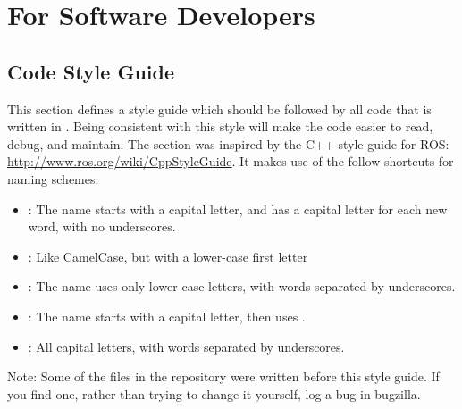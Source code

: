 
\chapter{For Software Developers}

\section{Code Style Guide}

This section defines a style guide which should be followed by all code that is written in \drake.  Being consistent with this style will make the code easier to read, debug, and maintain.  The section was inspired by the C++ style guide for ROS: \url{http://www.ros.org/wiki/CppStyleGuide}.  It makes use of the follow shortcuts for naming schemes:

\begin{itemize}
\item {}: The name starts with a capital letter, and has a capital letter for each new word, with no underscores.
\item {}: Like CamelCase, but with a lower-case first letter
\item {}: The name uses only lower-case letters, with words separated by underscores.
\item {}: The name starts with a capital letter, then uses .
\item {}: All capital letters, with words separated by underscores.
\end{itemize}

\noindent Note: Some of the files in the repository were written before this style guide.  
If you find one, rather than trying to change it yourself, log a bug in bugzilla.


